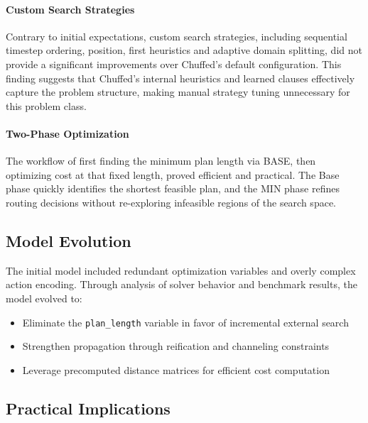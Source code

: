 \documentclass[a4paper,12pt]{article}
\begin{document}
\paragraph{Custom Search Strategies} Contrary to initial expectations, custom search strategies, including sequential timestep ordering, position, first heuristics and adaptive domain splitting, did not provide a significant improvements over Chuffed's default configuration. This finding suggests that Chuffed's internal heuristics and learned clauses effectively capture the problem structure, making manual strategy tuning unnecessary for this problem class.

\paragraph{Two-Phase Optimization} The workflow of first finding the minimum plan length via BASE, then optimizing cost at that fixed length, proved efficient and practical. The Base phase quickly identifies the shortest feasible plan, and the MIN phase refines routing decisions without re-exploring infeasible regions of the search space.

\subsection{Model Evolution}

The initial model included redundant optimization variables and overly complex action encoding. Through analysis of solver behavior and benchmark results, the model evolved to:
\begin{itemize}
    \item Eliminate the \texttt{plan\_length} variable in favor of incremental external search
    \item Strengthen propagation through reification and channeling constraints
    \item Leverage precomputed distance matrices for efficient cost computation
\end{itemize}

\subsection{Practical Implications}
\end{document}
